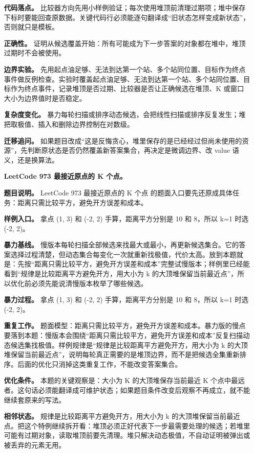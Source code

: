\textbf{代码落点。} 比较器方向先用小样例验证；每次使用堆顶前清理过期项；堆中保存下标时要能回查原数据。关键代码行必须能逐句翻译成“旧状态怎样变成新状态”，否则就只是模板。

\textbf{正确性。} 证明从候选覆盖开始：所有可能成为下一步答案的对象都在堆中，堆顶过期时不会被使用。

\textbf{边界实验。} 先用起点油足够、无法到达第一个站、多个站同位置、目标作为终点事件做反例检查。实验时覆盖起点油足够、无法到达第一个站、多个站同位置、目标作为终点事件，记录堆顶是否过期、比较器是否让正确候选在堆顶、K 或窗口大小为边界值时是否稳定。

\textbf{复杂度变化。} 暴力每轮扫描或排序动态候选，会把线性扫描或排序反复发生；堆把取极值、插入和删除边界控制在对数级。

\textbf{迁移追问。} 如果题目改成“这是反悔贪心，堆里保存的是已经经过但尚未使用的资源”，先判断原状态是否仍然覆盖新答案集合，再决定是微调边界、改 value 语义，还是换算法。

\noindent\textbf{LeetCode 973 最接近原点的 K 个点。}

\textbf{题目说明。} LeetCode 973 最接近原点的 K 个点 的题面入口要先还原成具体任务：距离只需比较平方，避免开方误差和成本。

\textbf{样例入口。} 拿点 (1, 3) 和 (-2, 2) 手算，距离平方分别是 10 和 8，所以 k=1 时选 (-2, 2)。

\textbf{暴力基线。} 慢版本每轮扫描全部候选来找最大或最小，再更新候选集合。它的答案选择过程清楚，但动态集合每变化一次就重新找极值，代价太高。放到本题就是：先按“距离只需比较平方，避免开方误差和成本”完整试慢版本；样例里已经能看到“规律是比较距离平方避免开方，用大小为 k 的大顶堆保留当前最近点”，所以优化前必须先能说清慢版本枚举了哪些候选。

\textbf{暴力过程。} 拿点 (1, 3) 和 (-2, 2) 手算，距离平方分别是 10 和 8，所以 k=1 时选 (-2, 2)。

\textbf{重复工作。} 题面模型：距离只需比较平方，避免开方误差和成本。暴力版的慢点要落到本题：慢版本会围绕“距离只需比较平方，避免开方误差和成本”反复扫描动态候选集找极值。样例规律是“规律是比较距离平方避免开方，用大小为 k 的大顶堆保留当前最近点”，说明每轮真正需要的是堆顶边界，而不是把候选全集重新排序。后面的优化只消掉这类重复工作，不能改变答案集合。

\textbf{优化条件。} 本题的关键观察是：大小为 K 的大顶堆保存当前最近 K 个点中最远者。这句话必须能翻译成可维护状态；如果题目条件改变后观察不再成立，就不能继续套原来的写法。

\textbf{相邻状态。} 规律是比较距离平方避免开方，用大小为 k 的大顶堆保留当前最近点。把这个特例继续拆开看：堆顶必须正好代表下一步最需要处理的候选；若堆里可能有过期对象，读取堆顶前要先清理。堆只解决动态极值，不自动证明被弹出或被丢弃的元素无用。

